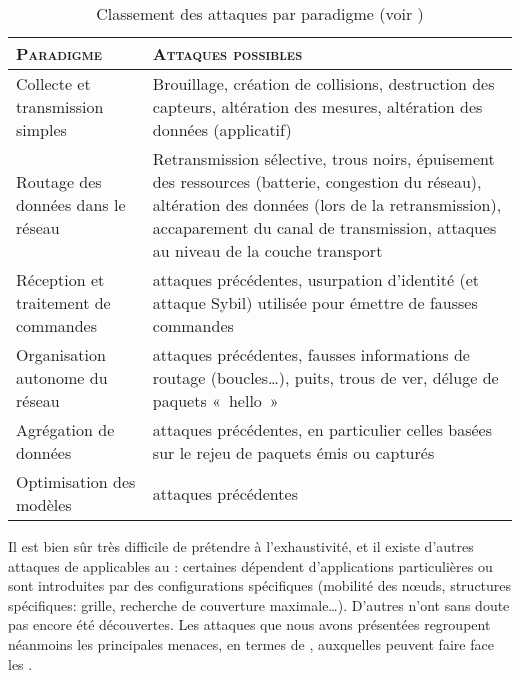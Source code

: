 \begin{table}[!ht]
    \caption{Classement des attaques par paradigme (voir )}\label{ea:tab:paradigm}
    \centering
    \medskip
    \begin{small}
        \begin{tabular}{m{}|m{}}
            \toprule
            \textsc{Paradigme} & \textsc{Attaques possibles}\\
            \midrule
            Collecte et transmission simples & Brouillage, création de collisions, destruction des capteurs, altération des mesures, altération des données (applicatif)\\
            \midrule
            Routage des données dans le réseau & Retransmission sélective, trous noirs, épuisement des ressources (batterie, congestion du réseau), altération des données (lors de la retransmission), accaparement du canal de transmission, attaques au niveau de la couche transport\\
            \midrule
            Réception et traitement de commandes & attaques précédentes, usurpation d'identité (et attaque Sybil) utilisée pour émettre de fausses commandes\\
            \midrule
            Organisation autonome du réseau & attaques précédentes, fausses informations de routage (boucles\dots), puits, trous de ver, déluge de paquets « hello »\\
            \midrule
            Agrégation de données & attaques précédentes, en particulier celles basées sur le rejeu de paquets émis ou capturés\\
            \midrule
            Optimisation des modèles & attaques précédentes\\
            \bottomrule
         \end{tabular}
     \end{small}
\end{table}

Il est bien sûr très difficile de prétendre à l'exhaustivité, et il existe d'autres attaques de \dds applicables au \rcs: certaines dépendent d'applications particulières ou sont introduites par des configurations spécifiques (mobilité des nœuds, structures spécifiques: grille, recherche de couverture maximale\dots).
D'autres n'ont sans doute pas encore été découvertes.
Les attaques que nous avons présentées regroupent néanmoins les principales menaces, en termes de \dds, auxquelles peuvent faire face les \rcs.

